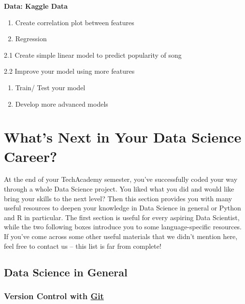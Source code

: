 \documentclass[
  11pt,
]{book}
\begin{document}
\textbf{Data: Kaggle Data}

\begin{enumerate}
\def\labelenumi{\arabic{enumi}.}
\item
  Create correlation plot between features
\item
  Regression
\end{enumerate}

2.1 Create simple linear model to predict popularity of song

2.2 Improve your model using more features

\begin{enumerate}
\def\labelenumi{\arabic{enumi}.}
\setcounter{enumi}{2}
\item
  Train/ Test your model
\item
  Develop more advanced models
\end{enumerate}

\newpage

\hypertarget{whats-next-in-your-data-science-career}{%
\chapter{What's Next in Your Data Science Career?}\label{whats-next-in-your-data-science-career}}

At the end of your TechAcademy semester, you've successfully coded your way through a whole Data Science project. You liked what you did and would like bring your skills to the next level? Then this section provides you with many useful resources to deepen your knowledge in Data Science in general or Python and R in particular. The first section is useful for every aspiring Data Scientist, while the two following boxes introduce you to some language-specific resources. If you've come across some other useful materials that we didn't mention here, feel free to contact us -- this list is far from complete!

\hypertarget{data-science-in-general}{%
\section{Data Science in General}\label{data-science-in-general}}

\hypertarget{version-control-with-git}{%
\subsection*{\texorpdfstring{Version Control with \href{https://github.com/}{Git}}{Version Control with Git}}\label{version-control-with-git}}
\end{document}
